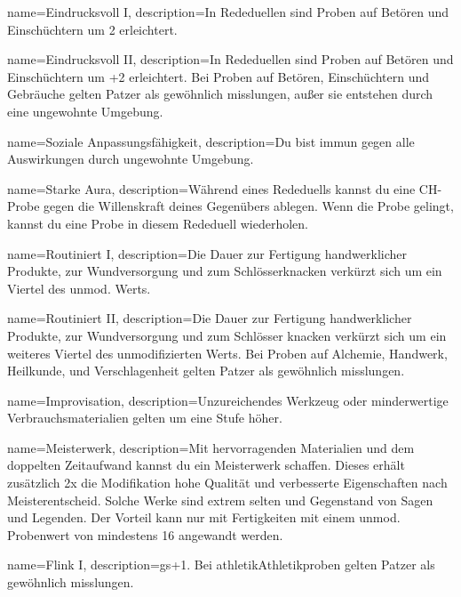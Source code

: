         
{
    name={Eindrucksvoll I},
    description={In Rededuellen sind Proben auf Betören und Einschüchtern um 2 erleichtert.}}

{
    name={Eindrucksvoll II},
    description={In Rededuellen sind Proben auf Betören und Einschüchtern um +2 erleichtert. Bei Proben auf Betören, Einschüchtern und Gebräuche gelten Patzer als gewöhnlich misslungen, außer sie entstehen durch eine ungewohnte Umgebung.}}

{
    name={Soziale Anpassungsfähigkeit},
    description={Du bist immun gegen alle Auswirkungen durch ungewohnte Umgebung.}}

{
    name={Starke Aura},
    description={Während eines Rededuells kannst du eine CH-Probe gegen die Willenskraft deines Gegenübers ablegen. Wenn die Probe gelingt, kannst du eine Probe in diesem Rededuell wiederholen.}}


{
    name={Routiniert I},
    description={Die Dauer zur Fertigung handwerklicher Produkte, zur Wundversorgung und zum Schlösserknacken verkürzt sich um ein Viertel des unmod. Werts.}}

{
    name={Routiniert II},
    description={Die Dauer zur Fertigung handwerklicher Produkte, zur Wundversorgung und zum Schlösser knacken verkürzt sich um ein weiteres Viertel des unmodifizierten Werts. Bei Proben auf Alchemie, Handwerk, Heilkunde, und Verschlagenheit gelten Patzer als gewöhnlich misslungen.}}

{
    name={Improvisation},
    description={Unzureichendes Werkzeug oder minderwertige
Verbrauchsmaterialien gelten um eine Stufe höher.}}

{
    name={Meisterwerk},
    description={Mit hervorragenden Materialien und dem doppelten Zeitaufwand kannst du ein Meisterwerk schaffen. Dieses erhält zusätzlich 2x die Modifikation hohe Qualität und verbesserte Eigenschaften nach Meisterentscheid. Solche Werke sind extrem selten und Gegenstand von Sagen und Legenden. Der Vorteil kann nur mit Fertigkeiten mit einem unmod. Probenwert von mindestens 16 angewandt werden.}}

{
    name={Flink I},
    description={\gls{gs}+1. Bei \gls{athletik}{Athletikproben} gelten Patzer als gewöhnlich misslungen.}}

